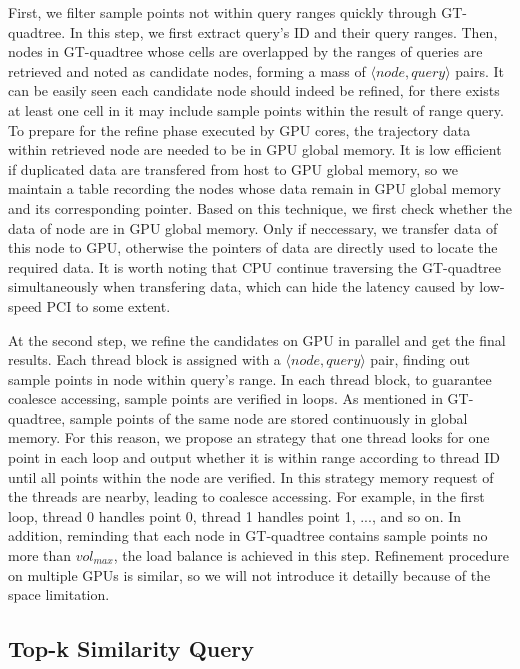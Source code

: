 \documentclass[conference]{IEEEtran}
\begin{document}
First, we filter sample points not within query ranges quickly through GT-quadtree. In this step, we first extract query's ID and their query ranges. Then, nodes in GT-quadtree whose cells are overlapped by the ranges of queries are retrieved and noted as candidate nodes, forming a mass of $\langle node, query\rangle $ pairs. It can be easily seen each candidate node should indeed be refined, for there exists at least one cell in it may include sample points within the result of range query. To prepare for the refine phase executed by GPU cores, the trajectory data within retrieved node are needed to be in GPU global memory. It is low efficient if duplicated data are transfered from host to GPU global memory, so we maintain a table recording the nodes whose data remain in GPU global memory and its corresponding pointer. Based on this technique, we first check whether the data of node are in GPU global memory. Only if neccessary, we transfer data of this node to GPU, otherwise the pointers of data are directly used to locate the required data. It is worth noting that CPU continue traversing the GT-quadtree simultaneously when transfering data, which can hide the latency caused by low-speed PCI to some extent. 

At the second step, we refine the candidates on GPU in parallel and get the final results. Each thread block is assigned with a $\langle node, query\rangle $ pair, finding out sample points in node within query's range. In each thread block, to guarantee coalesce accessing, sample points are verified in loops. As mentioned in GT-quadtree, sample points of the same node are stored continuously in global memory. For this reason, we propose an strategy that one thread looks for one point in each loop and output whether it is within range according to thread ID until all points within the node are verified. In this strategy memory request of the threads are nearby, leading to coalesce accessing. For example, in the first loop, thread 0 handles point 0, thread 1 handles point 1, ..., and so on. In addition, reminding that each node in GT-quadtree contains sample points no more than $vol_{max}$, the load balance is achieved in this step. Refinement procedure on multiple GPUs is similar, so we will not introduce it detailly because of the space limitation.


\subsection{Top-k Similarity Query}
\end{document}
